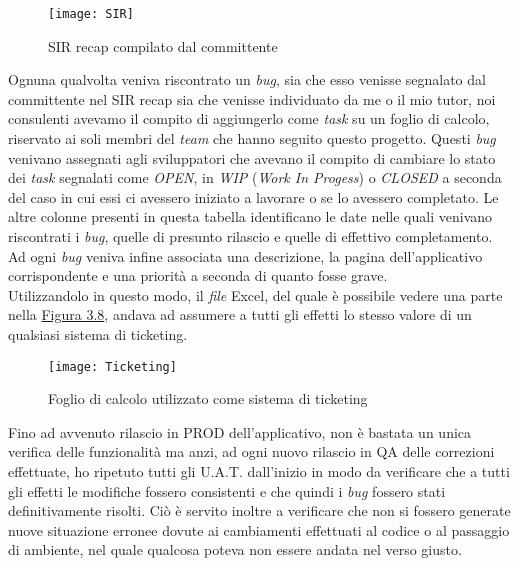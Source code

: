 \begin{figure}[h!]
\begin{center}
\texttt{[image: SIR]}
\caption{SIR recap compilato dal committente}
\label{sir}
\end{center}
\end{figure}
\FloatBarrier

Ognuna qualvolta veniva riscontrato un \textit{bug}, sia che esso venisse segnalato dal committente nel SIR recap sia che venisse individuato da me o il mio tutor, noi consulenti avevamo il compito di aggiungerlo come \textit{task} su un foglio di calcolo, riservato ai soli membri del \textit{team} che hanno seguito questo progetto. Questi \textit{bug} venivano assegnati agli sviluppatori che avevano il compito di cambiare lo stato dei \textit{task} segnalati come \textit{OPEN}, in \textit{WIP} (\emph{Work In Progess}) o \textit{CLOSED} a seconda del caso in cui essi ci avessero iniziato a lavorare o se lo avessero completato. Le altre colonne presenti in questa tabella identificano le date nelle quali venivano riscontrati i \textit{bug}, quelle di presunto rilascio e quelle di effettivo completamento. Ad ogni \textit{bug} veniva infine associata una descrizione, la pagina dell'applicativo corrispondente e una priorità a seconda di quanto fosse grave. \\ Utilizzandolo in questo modo, il \textit{file} Excel, del quale è possibile vedere una parte nella \hyperref[bug-report]{Figura 3.8}, andava ad assumere a tutti gli effetti lo stesso valore di un qualsiasi \gls{sistema di ticketing}.

\newpage
\begin{figure}[h!]
\begin{center}
\texttt{[image: Ticketing]}
\caption{Foglio di calcolo utilizzato come sistema di ticketing}
\label{bug-report}
\end{center}
\end{figure}
\FloatBarrier

Fino ad avvenuto rilascio in PROD dell'applicativo, non è bastata un unica verifica delle funzionalità ma anzi, ad ogni nuovo rilascio in QA delle correzioni effettuate, ho ripetuto tutti gli U.A.T. dall'inizio in modo da verificare che a tutti gli effetti le modifiche fossero consistenti e che quindi i \textit{bug} fossero stati definitivamente risolti. Ciò è servito inoltre a verificare che non si fossero generate nuove situazione erronee dovute ai cambiamenti effettuati al codice o al passaggio di ambiente, nel quale qualcosa poteva non essere andata nel verso giusto.

